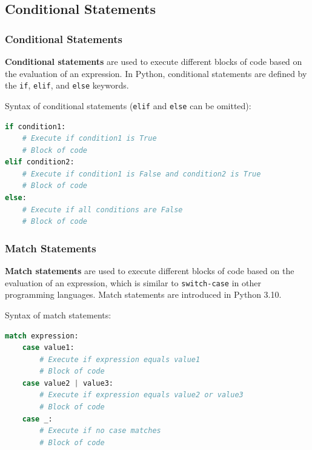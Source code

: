 \documentclass[beamer, en, version=2.0]{huangfusl-template}
\begin{document}
    \subsection{Conditional Statements}
    \begin{frame}[fragile]
        \frametitle{Conditional Statements}

        \textbf{Conditional statements} are used to execute different blocks of code based on the evaluation of an expression. In Python, conditional statements are defined by the {\footnotesize\verb|if|}, {\footnotesize\verb|elif|}, and {\footnotesize\verb|else|} keywords.

        Syntax of conditional statements ({\footnotesize\verb|elif|} and {\footnotesize\verb|else|} can be omitted):

\begin{lstlisting}[language=python]
if condition1:
    # Execute if condition1 is True
    # Block of code
elif condition2:
    # Execute if condition1 is False and condition2 is True
    # Block of code
else:
    # Execute if all conditions are False
    # Block of code
\end{lstlisting}
    \end{frame}
    \begin{frame}[fragile]
        \frametitle{Match Statements}

        \textbf{Match statements} are used to execute different blocks of code based on the evaluation of an expression, which is similar to {\footnotesize\verb|switch-case|} in other programming languages. Match statements are introduced in Python 3.10.

        Syntax of match statements:

\begin{lstlisting}[language=python]
match expression:
    case value1:
        # Execute if expression equals value1
        # Block of code
    case value2 | value3:
        # Execute if expression equals value2 or value3
        # Block of code
    case _:
        # Execute if no case matches
        # Block of code
\end{lstlisting}
    \end{frame}
\end{document}
